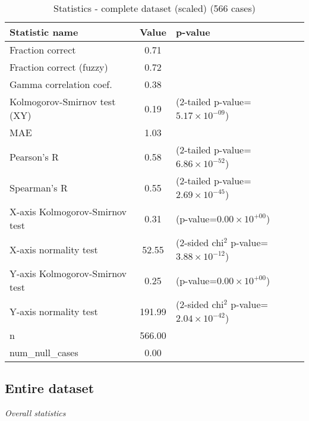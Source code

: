 \documentclass[10pt, letterpaper, oneside, titlepage, landscape]{scrreprt}
\begin{document}
\begin{table}[H]\begin{center}
\begin{tabular}{ l S[table-format=3.2] l}
Statistic name & {Value} & p-value\\
\hline
Fraction correct & 0.71 & \\
Fraction correct (fuzzy) & 0.72 & \\
Gamma correlation coef. & 0.38 & \\
Kolmogorov-Smirnov test (XY) & 0.19 & (2-tailed p-value=$5.17\times10^{-09}$)\\
MAE & 1.03 & \\
Pearson's R & 0.58 & (2-tailed p-value=$6.86\times10^{-52}$)\\
Spearman's R & 0.55 & (2-tailed p-value=$2.69\times10^{-45}$)\\
X-axis Kolmogorov-Smirnov test & 0.31 & (p-value=$0.00\times10^{+00}$)\\
X-axis normality test & 52.55 & (2-sided chi$^{2}$ p-value=$3.88\times10^{-12}$)\\
Y-axis Kolmogorov-Smirnov test & 0.25 & (p-value=$0.00\times10^{+00}$)\\
Y-axis normality test & 191.99 & (2-sided chi$^{2}$ p-value=$2.04\times10^{-42}$)\\
n & 566.00 & \\
num\_null\_cases & 0.00 & \\
\end{tabular}
\caption{Statistics - complete dataset (scaled) (566 cases)}
\end{center}\end{table}


\subsection{Entire dataset}
\textit{Overall statistics}
\end{document}
